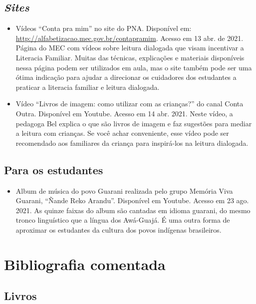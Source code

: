 \documentclass[11pt]{extarticle}
\begin{document}
\subsection{\textit{Sites}}

\begin{itemize}
\item Vídeos “Conta pra mim” no site do PNA. Disponível em: \url{http://alfabetizacao.mec.gov.br/contapramim}. 
Acesso em 13 abr. de 2021.
Página do MEC com vídeos sobre leitura dialogada que visam incentivar a Literacia Familiar. Muitas das 
técnicas, explicações e materiais disponíveis nessa página podem ser utilizados em aula, mas o site também 
pode ser uma ótima indicação para ajudar a direcionar os cuidadores dos estudantes a praticar 
a literacia familiar e leitura dialogada.

\item Vídeo “Livros de imagem: como utilizar com as crianças?” do canal Conta Outra. Disponível em Youtube. 
Acesso em 14 abr. 2021. 
Neste vídeo, a pedagoga Bel explica o que são livros de imagem e faz sugestões para mediar a leitura com 
crianças. Se você achar conveniente, esse vídeo pode ser recomendado aos familiares da criança 
para inspirá-los na leitura dialogada. 

\end{itemize}

\subsection{Para os estudantes}
\begin{itemize}

\item Album de música do povo Guarani realizada pelo grupo Memória Viva Guarani,
``Ñande Reko Arandu''. Disponível em Youtube. Acesso em 23 ago. 2021. 
As quinze faixas do album são cantadas em idioma guarani, do mesmo tronco 
linguístico que a língua dos Awá-Guajá. É uma outra forma de aproximar 
os estudantes da cultura dos povos indígenas brasileiros. 


\end{itemize}


\section{Bibliografia comentada}

\subsection{Livros}
\end{document}
